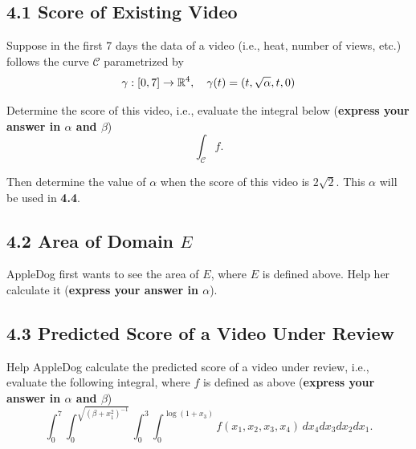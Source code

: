 \documentclass[12pt]{article}
\renewcommand{\emph}[1]{{\color{Turquoise3}\textsl{#1}}}
\begin{document}
\subsection*{4.1 Score of Existing Video} 
\par Suppose in the first 7 days the data of a video (i.e., heat, number of views, etc.) follows the curve $\mathcal{C}$ parametrized by 
\begin{equation*}
    \gamma:[0,7]\to \mathbb{R}^4,\quad \gamma(t) = (t, \sqrt{\alpha}, t, 0)
\end{equation*}

\par Determine the score of this video, i.e., evaluate the integral below (\textbf{express your answer in $\alpha$ and $\beta$}) 
\begin{equation*}
    \int_{\mathcal{C}}f. 
\end{equation*}

\par Then determine the value of $\alpha$ when the score of this video is $2\sqrt{2}$. This \emph{$\alpha$} will be used in \textbf{4.4}. 

\subsection*{4.2 Area of Domain $E$} 
AppleDog first wants to see the area of $E$, where $E$ is defined above. Help her calculate it (\textbf{express your answer in $\alpha$}).  

\subsection*{4.3 Predicted Score of a Video Under Review}
Help AppleDog calculate the predicted score of a video under review, i.e., evaluate the following integral, where $f$ is defined as above (\textbf{express your answer in $\alpha$ and $\beta$}) 
\begin{equation*}
	    \int_0^7 \int_0^{\sqrt{(\beta + x_1^2)^{-1}}} \int_0^{3} \int_0^{\log(1 + x_3)} f(x_1, x_2, x_3, x_4)\,dx_4 dx_3 dx_2 dx_1.
\end{equation*}

\end{document}

